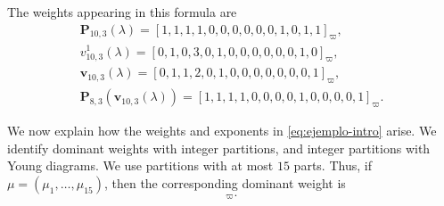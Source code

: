 The weights appearing in this formula are
\begin{equation}
\begin{array}{r}
\mathbf{P}_{10,3}(\lambda)= [1,1,1,1,0,0,0,0,0,0,1,0,1,1]_{\varpi},\\[3pt]
 v_{10,3}^1(\lambda)= [0,1,0,3,0,1,0,0,0,0,0,0,1,0]_{\varpi}, \\[3pt]
\mathbf{v}_{10,3}(\lambda)= [0,1,1,2,0,1,0,0,0,0,0,0,0,1]_{\varpi}, \\[3pt]
\mathbf{P}_{8,3}(\mathbf{v}_{10,3}(\lambda)) = [1, 1, 1, 1, 0, 0, 0, 0, 1, 0, 0, 0, 0, 1]_{\varpi}.
\end{array}
\end{equation}

We now explain how the weights and exponents in \eqref{eq:ejemplo-intro} arise. We identify dominant weights with integer partitions, and integer partitions with Young diagrams. We use partitions with at most $15$ parts. Thus, if $\mu=(\mu_1,\ldots,\mu_{15})$, then the corresponding dominant weight is
\begin{equation}
[\mu_1-\mu_2,\mu_2-\mu_3,\ldots,\mu_{14}-\mu_{15}]_{\varpi}.
\end{equation}

